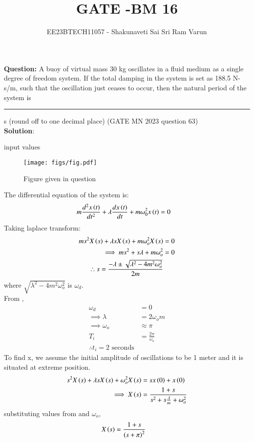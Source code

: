 \documentclass[journal,12pt,twocolumn]{IEEEtran}
\theoremstyle{remark}
\begin{document}

\vspace{3cm}

\title{GATE -BM 16}
\author{EE23BTECH11057 - Shakunaveti Sai Sri Ram Varun$^{}$%
}
\maketitle
\newpage
\bigskip
\vspace{2cm}
\textbf{Question: }
A buoy of virtual mass 30 kg oscillates in a fluid medium as a single degree of
freedom system. If the total damping in the system is set as 188.5 N-s/m, such
that the oscillation just ceases to occur, then the natural period of the system is
\rule{1cm}{0.15mm} s (round off to one decimal place)
\hfill(GATE MN 2023 question 63)\\

\textbf{Solution}:\\
\begin{table}[h!] 
\centering

\caption{input values}
\label{tab: Table mn63}
\end{table}

\begin{figure}[h!]
    \texttt{[image: figs/fig.pdf]}
    \caption{Figure given in question }
    \centering
    \label{fig: nm_63_fig_1}
\end{figure}
The differential equation of the system is:
\begin{align}
m\frac{d^2x\left(t\right)}{dt^2} + \lambda \frac{dx\left(t\right)}{dt} + m\omega_0^2 x\left(t\right) &= 0
\end{align}
Taking laplace transform:
\begin{align}
ms^2X\left(s\right) + \lambda s X\left(s\right) + m\omega_o^2 X\left(s\right)&=0\\
\implies ms^2 + s\lambda + m\omega_o^2 &=0\\
\therefore s = \frac{-\lambda \pm \sqrt{\lambda^2 - 4 m^2 \omega_o^2}}{2m}
\end{align}
where $ \sqrt{\lambda^2 - 4 m^2 \omega_o^2}$ is $ \omega_d$.\\
From ,
\begin{align}
\omega_d &=0\\
\implies \lambda &= 2\omega_o m\\
\implies \omega_o &\approx \pi\\
 T_i &= \frac{2\pi}{\omega_o}\\
 \therefore t_i = 2\text{ seconds}
\end{align}
To find x, we assume the initial amplitude of oscillations to be 1 meter and it is situated at extreme position.
\begin{align}
s^2X\left(s\right) + \lambda s X\left(s\right) + \omega_o^2 X\left(s\right)&=sx\left(0\right)+x\left(0\right)\\
\implies X\left(s\right)&=\frac{1+s}{s^2 + s\frac{\lambda}{m} + \omega_o^2}
\end{align}
substituting values from  and $\omega_o$,
\begin{align}
X\left(s\right) &= \frac{1+s}{\left(s+\pi\right)^2}
\end{align}
\vspace{3cm}
\end{document}

